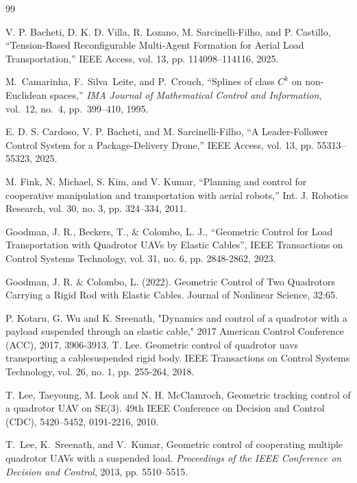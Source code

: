 \documentclass[letterpaper, 10 pt, conference]{ieeeconf}  %
\begin{document}
\begin{thebibliography}{99}

 V. P. Bacheti, D. K. D. Villa, R. Lozano, M. Sarcinelli-Filho, and P. Castillo,
“Tension-Based Reconfigurable Multi-Agent Formation for Aerial Load Transportation,”
IEEE Access, vol. 13, pp. 114098–114116, 2025.



M.~Camarinha, F.~Silva~Leite, and P.~Crouch,
``Splines of class $C^k$ on non-Euclidean spaces,''
\emph{IMA Journal of Mathematical Control and Information},
vol.~12, no.~4, pp.~399--410, 1995.


 E. D. S. Cardoso, V. P. Bacheti, and M. Sarcinelli-Filho,
“A Leader-Follower Control System for a Package-Delivery Drone,”
IEEE Access, vol. 13, pp. 55313–55323, 2025.


 M. Fink, N. Michael, S. Kim, and V. Kumar, “Planning and control for cooperative manipulation and transportation with aerial robots,” Int. J. Robotics Research, vol. 30, no. 3, pp. 324–334, 2011.



 Goodman, J. R., Beckers, T., $\&$ Colombo, L. J., “Geometric Control for Load Transportation with Quadrotor UAVs by Elastic Cables”, IEEE Transactions on Control Systems Technology, vol. 31, no. 6, pp. 2848-2862, 2023.

 Goodman, J. R. $\&$ Colombo, L. (2022). Geometric Control of Two Quadrotors Carrying a Rigid Rod with Elastic Cables. Journal of Nonlinear Science, 32:65.

P. Kotaru, G. Wu and K. Sreenath, "Dynamics and control of a quadrotor with a payload suspended through an elastic cable," 2017 American Control Conference (ACC), 2017, 3906-3913.
T. Lee. Geometric control of quadrotor uavs transporting a cablesuspended rigid body. IEEE Transactions on Control Systems Technology, vol. 26, no. 1, pp. 255-264, 2018.

 T. Lee, Taeyoung, M. Leok and N. H. {McClamroch}, Geometric tracking control of a quadrotor {UAV} on {SE}(3). 49th {IEEE} Conference on Decision and Control ({CDC}), 5420--5452, 0191-2216, 2010.

T.~Lee, K.~Sreenath, and V.~Kumar, Geometric control of cooperating multiple
  quadrotor {UAV}s with a suspended load.  \textit{Proceedings of the IEEE
  Conference on Decision and Control}, 2013, pp. 5510--5515.


\end{thebibliography}
\end{document}
